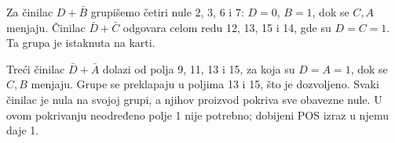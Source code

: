 
Za činilac \(D+\bar B\) grupišemo četiri nule 2, 3, 6 i 7: \(D=0\), \(B=1\), dok se \(C,A\) menjaju. Činilac \(\bar D+\bar C\) odgovara celom redu 12, 13, 15 i 14, gde su \(D=C=1\). Ta grupa je istaknuta na karti.

Treći činilac \(\bar D+\bar A\) dolazi od polja 9, 11, 13 i 15, za koja su \(D=A=1\), dok se \(C,B\) menjaju. Grupe se preklapaju u poljima 13 i 15, što je dozvoljeno. Svaki činilac je nula na svojoj grupi, a njihov proizvod pokriva sve obavezne nule. U ovom pokrivanju neodređeno polje 1 nije potrebno; dobijeni POS izraz u njemu daje 1.

